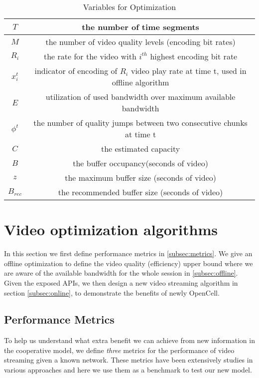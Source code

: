 \begin{table*}[ht]
\begin{tabular} {|c |c |}
\hline
$T$ &the number of time segments\\ \hline
$M$ &the number of video quality levels (encoding bit rates)\\ \hline
$R_i$& the rate for the video with $i^{th}$ highest encoding bit rate\\ \hline
$x_i^t$&indicator of encoding of $R_i$ video play rate at time t, used in offline algorithm \\ \hline
$E$& utilization of used bandwidth over maximum available bandwidth \\ \hline
$\phi^t$ &the number of quality jumps between two consecutive chunks at time t\\ \hline
$C $ &the estimated capacity\\ \hline
$B $ &the buffer occupancy(seconds of video) \\ \hline
$z $ &the maximum buffer size (seconds of video) \\ \hline
$B_{rec} $ &the recommended buffer size (seconds of video) \\ \hline
\end{tabular}
\centering
\caption{Variables for Optimization}
\end{table*}

\section{Video optimization algorithms}\label{sec:optimization}
In this section we first define performance metrics in \autoref{subsec:metrics}. We give an offline optimization to define the video quality (efficiency) upper bound where we are aware of the available bandwidth for the whole session in \autoref{subsec:offline}.  Given the exposed APIs, we then design a new video streaming algorithm in section \ref{subsec:online},  to demonstrate the benefits of newly OpenCell.


\subsection{Performance Metrics}\label{subsec:metrics}
To help us understand what extra benefit we can achieve from new information in the cooperative model, we define \emph{three} metrics for the performance of video streaming given a known network. These metrics have been extensively studies in various approaches and here we use them as a benchmark to test our new model\cite{Qava, Avis,VideoMeasurement, Festive}.

